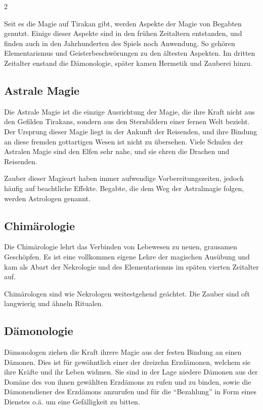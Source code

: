 \begin{multicols}{2}
{Seit es die Magie auf Tirakan gibt, werden Aspekte der Magie von Begabten genutzt.
Einige dieser Aspekte sind in den frühen Zeitaltern entstanden, und finden auch in den Jahrhunderten des Spiels noch Anwendung.
So gehören Elementarismus und Geisterbeschwörungen zu den ältesten Aspekten.
Im dritten Zeitalter enstand die Dämonologie, später kamen Hermetik und Zauberei hinzu.

\subsection{Astrale Magie}\label{subsec:astrale-magie}

Die Astrale Magie ist die einzige Ausrichtung der Magie, die ihre Kraft nicht aus den Gefilden Tirakans, sondern aus den Sternbildern einer fernen Welt bezieht.
Der Ursprung dieser Magie liegt in der Ankunft der Reisenden, und ihre Bindung an diese fremden gottartigen Wesen ist nicht zu übersehen.
Viele Schulen der Astralen Magie sind den Elfen sehr nahe, und sie ehren die Drachen und Reisenden.

Zauber dieser Magieart haben immer aufwendige Vorbereitungszeiten, jedoch häufig auf beachtliche Effekte.
Begabte, die dem Weg der Astralmagie folgen, werden Astrologen genannt.

\subsection{Chimärologie}\label{subsec:chimarologie}

Die Chimärologie lehrt das Verbinden von Lebewesen zu neuen, grausamen Geschöpfen.
Es ist eine vollkommen eigene Lehre der magischen Ausübung und kam als Abart der Nekrologie und des Elementarismus im späten vierten Zeitalter auf.

Chimärologen sind wie Nekrologen weitestgehend geächtet.
Die Zauber sind oft langwierig und ähneln Ritualen.

\subsection{Dämonologie}\label{subsec:damonologie}

Dämonologen ziehen die Kraft ihrere Magie aus der festen Bindung an einen Dämonen.
Dies ist für gewöhntlich einer der dreizehn Erzdämonen, welchem sie ihre Kräfte und ihr Leben widmen.
Sie sind in der Lage niedere Dämonen aus der Domäne des von ihnen gewählten Erzdämons zu rufen und zu binden, sowie die Dämonendiener des Erzdämons anzurufen und für die ``Bezahlung'' in Form eines Dienstes o.ä. um eine Gefälligkeit zu bitten.

}
\end{multicols}
